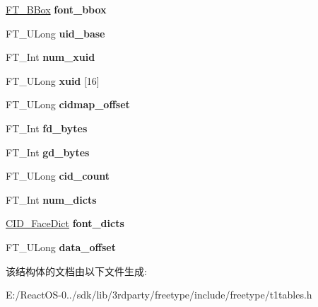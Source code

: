 \begin{DoxyCompactItemize}
\hyperlink{struct_f_t___b_box__}{F\+T\+\_\+\+B\+Box} {\bfseries font\+\_\+bbox}
\item 
\mbox{\label{struct_c_i_d___face_info_rec___a1fae2d9b863a9e27089894789ab4413e}} 
F\+T\+\_\+\+U\+Long {\bfseries uid\+\_\+base}
\item 
\mbox{\label{struct_c_i_d___face_info_rec___ab7dc17fbfc7926996832513266e88623}} 
F\+T\+\_\+\+Int {\bfseries num\+\_\+xuid}
\item 
\mbox{\label{struct_c_i_d___face_info_rec___a32cd8836dd8a395d9aa6fb5831f06b27}} 
F\+T\+\_\+\+U\+Long {\bfseries xuid} \mbox{[}16\mbox{]}
\item 
\mbox{\label{struct_c_i_d___face_info_rec___a8c72c1a90704c7e3519ca182613fec5a}} 
F\+T\+\_\+\+U\+Long {\bfseries cidmap\+\_\+offset}
\item 
\mbox{\label{struct_c_i_d___face_info_rec___a72944c0b4e85dba619adaf114ff7a8b1}} 
F\+T\+\_\+\+Int {\bfseries fd\+\_\+bytes}
\item 
\mbox{\label{struct_c_i_d___face_info_rec___a4f1caffd756d0daebbc69af0dcdd74a0}} 
F\+T\+\_\+\+Int {\bfseries gd\+\_\+bytes}
\item 
\mbox{\label{struct_c_i_d___face_info_rec___a5eae3fdfaded7bdef4e0bd027ecba595}} 
F\+T\+\_\+\+U\+Long {\bfseries cid\+\_\+count}
\item 
\mbox{\label{struct_c_i_d___face_info_rec___a3b53b4e162a3c1434c6b91334aa69041}} 
F\+T\+\_\+\+Int {\bfseries num\+\_\+dicts}
\item 
\mbox{\label{struct_c_i_d___face_info_rec___a821a773b846c837338d1c03984e5e7d5}} 
\hyperlink{struct_c_i_d___face_dict_rec__}{C\+I\+D\+\_\+\+Face\+Dict} {\bfseries font\+\_\+dicts}
\item 
\mbox{\label{struct_c_i_d___face_info_rec___a31e8fb9ac2b0c1fa63220e5e07aeea97}} 
F\+T\+\_\+\+U\+Long {\bfseries data\+\_\+offset}
\end{DoxyCompactItemize}


该结构体的文档由以下文件生成\+:\begin{DoxyCompactItemize}
\item 
E\+:/\+React\+O\+S-\/0../sdk/lib/3rdparty/freetype/include/freetype/t1tables.\+h\end{DoxyCompactItemize}
